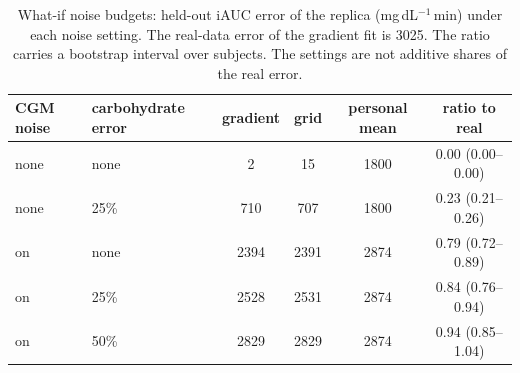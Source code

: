 \begin{table}[t]
\centering\small
\begin{tabular}{llcccc}
\toprule
CGM noise & carbohydrate error & gradient & grid & personal mean & ratio to real \\
\midrule
none & none & 2 & 15 & 1800 & 0.00 (0.00--0.00) \\
none & 25\% & 710 & 707 & 1800 & 0.23 (0.21--0.26) \\
on & none & 2394 & 2391 & 2874 & 0.79 (0.72--0.89) \\
on & 25\% & 2528 & 2531 & 2874 & 0.84 (0.76--0.94) \\
on & 50\% & 2829 & 2829 & 2874 & 0.94 (0.85--1.04) \\
\bottomrule
\end{tabular}
\caption{What-if noise budgets: held-out iAUC error of the replica (mg\,dL$^{-1}$\,min) under each noise setting. The real-data error of the gradient fit is 3025. The ratio carries a bootstrap interval over subjects. The settings are not additive shares of the real error.}
\label{tab:noise}
\end{table}
